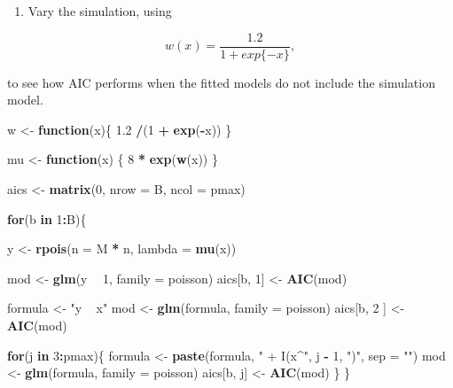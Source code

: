 \documentclass[]{article}
\newenvironment{Shaded}{\begin{snugshade}}{\end{snugshade}}
\newcommand{\ControlFlowTok}[1]{\textcolor[rgb]{0.13,0.29,0.53}{\textbf{#1}}}
\newcommand{\DataTypeTok}[1]{\textcolor[rgb]{0.13,0.29,0.53}{#1}}
\newcommand{\DecValTok}[1]{\textcolor[rgb]{0.00,0.00,0.81}{#1}}
\newcommand{\FloatTok}[1]{\textcolor[rgb]{0.00,0.00,0.81}{#1}}
\newcommand{\KeywordTok}[1]{\textcolor[rgb]{0.13,0.29,0.53}{\textbf{#1}}}
\newcommand{\NormalTok}[1]{#1}
\newcommand{\OperatorTok}[1]{\textcolor[rgb]{0.81,0.36,0.00}{\textbf{#1}}}
\newcommand{\StringTok}[1]{\textcolor[rgb]{0.31,0.60,0.02}{#1}}
\providecommand{\tightlist}{%
  \setlength{\itemsep}{0pt}\setlength{\parskip}{0pt}}
\begin{document}
\begin{enumerate}
\def\labelenumi{\arabic{enumi}.}
\setcounter{enumi}{1}
\tightlist
\item
  Vary the simulation, using
\end{enumerate}

\[ w(x) = \frac{1.2}{1 + exp\{-x\}},\]

to see how AIC performs when the fitted models do not include the
simulation model.

\begin{Shaded}
\begin{Highlighting}[]
\NormalTok{w <-}\StringTok{ }\ControlFlowTok{function}\NormalTok{(x)\{}
  \FloatTok{1.2} \OperatorTok{/}\NormalTok{(}\DecValTok{1} \OperatorTok{+}\StringTok{ }\KeywordTok{exp}\NormalTok{(}\OperatorTok{-}\NormalTok{x))}
\NormalTok{\}}

\NormalTok{mu <-}\StringTok{ }\ControlFlowTok{function}\NormalTok{(x) \{}
  \DecValTok{8} \OperatorTok{*}\StringTok{ }\KeywordTok{exp}\NormalTok{(}\KeywordTok{w}\NormalTok{(x))}
\NormalTok{\}}

\NormalTok{aics <-}\StringTok{ }\KeywordTok{matrix}\NormalTok{(}\DecValTok{0}\NormalTok{, }\DataTypeTok{nrow =}\NormalTok{ B, }\DataTypeTok{ncol =}\NormalTok{ pmax)}

\ControlFlowTok{for}\NormalTok{(b }\ControlFlowTok{in} \DecValTok{1}\OperatorTok{:}\NormalTok{B)\{}
  
\NormalTok{  y <-}\StringTok{ }\KeywordTok{rpois}\NormalTok{(}\DataTypeTok{n =}\NormalTok{ M }\OperatorTok{*}\StringTok{ }\NormalTok{n, }\DataTypeTok{lambda =} \KeywordTok{mu}\NormalTok{(x))}
  
\NormalTok{  mod <-}\StringTok{ }\KeywordTok{glm}\NormalTok{(y }\OperatorTok{~}\StringTok{ }\DecValTok{1}\NormalTok{, }\DataTypeTok{family =}\NormalTok{ poisson)}
\NormalTok{  aics[b, }\DecValTok{1}\NormalTok{] <-}\StringTok{ }\KeywordTok{AIC}\NormalTok{(mod)}
  
\NormalTok{  formula <-}\StringTok{ "y ~ x"}
\NormalTok{  mod <-}\StringTok{ }\KeywordTok{glm}\NormalTok{(formula, }\DataTypeTok{family =}\NormalTok{ poisson)}
\NormalTok{  aics[b, }\DecValTok{2}\NormalTok{ ] <-}\StringTok{ }\KeywordTok{AIC}\NormalTok{(mod)}
  
  \ControlFlowTok{for}\NormalTok{(j }\ControlFlowTok{in} \DecValTok{3}\OperatorTok{:}\NormalTok{pmax)\{}
\NormalTok{    formula <-}\StringTok{ }\KeywordTok{paste}\NormalTok{(formula, }\StringTok{" + I(x^"}\NormalTok{, j }\OperatorTok{-}\StringTok{ }\DecValTok{1}\NormalTok{, }\StringTok{")"}\NormalTok{, }\DataTypeTok{sep =} \StringTok{""}\NormalTok{)}
\NormalTok{    mod <-}\StringTok{ }\KeywordTok{glm}\NormalTok{(formula, }\DataTypeTok{family =}\NormalTok{ poisson)}
\NormalTok{    aics[b, j] <-}\StringTok{ }\KeywordTok{AIC}\NormalTok{(mod)}
\NormalTok{  \}}
\NormalTok{\}}


\end{Highlighting}
\end{Shaded}
\end{document}
